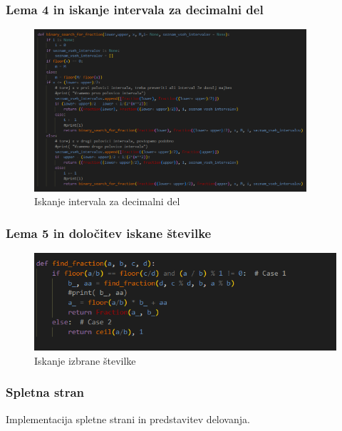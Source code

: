 \documentclass[a4paper,14pt]{beamer}
\begin{document}
\begin{frame}
    \frametitle{Lema 4 in iskanje intervala za decimalni del}
        \begin{figure}
            \centering
            \includegraphics[width = 0.9\textwidth]{Iskanje_intervala_za_racionalni_del.png}
            \caption{Iskanje intervala za decimalni del}
        \end{figure}
\end{frame}



\begin{frame}
    \frametitle{Lema 5 in določitev iskane številke}
        \begin{figure}
            \centering
            \includegraphics[width = 1\textwidth]{find_fraction.png}
            \caption{Iskanje izbrane številke}
        \end{figure}
\end{frame}

\begin{frame}
    \frametitle{Spletna stran}
       Implementacija spletne strani in predstavitev delovanja.
\end{frame}
\end{document}

